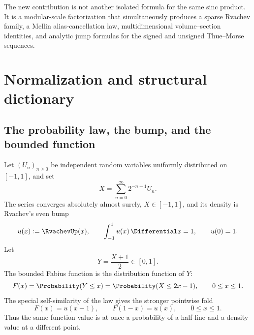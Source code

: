 \documentclass[11pt]{article}
\theoremstyle{definition}
\theoremstyle{remark}
\begin{document}
\begin{statusboxPartx}
The new contribution is not another isolated formula for the same sinc product.
It is a modular-scale factorization that simultaneously produces a sparse
Rvachev family, a Mellin alias-cancellation law, multidimensional volume--section
identities, and analytic jump formulas for the signed and unsigned Thue--Morse
sequences.
\end{statusboxPartx}

\section{Normalization and structural dictionary}
\label{p5:sec:normalization}

\subsection{The probability law, the bump, and the bounded function}

Let $(U_n)_{n\ge0}$ be independent random variables uniformly distributed on
$[-1,1]$, and set
\begin{equation}
 X=\sum_{n=0}^{\infty}2^{-n-1}U_n.                         \label{p5:eq:X-series}
\end{equation}
The series converges absolutely almost surely, $X\in[-1,1]$, and its density is
Rvachev's even bump
\begin{equation}
 u(x):=\RvachevUp(x),\qquad \int_{-1}^{1}u(x)\,\Differential x=1,
 \qquad u(0)=1.                                            \label{p5:eq:u-normalization}
\end{equation}
Let
\begin{equation}
 Y=\frac{X+1}{2}\in[0,1].                                  \label{p5:eq:Y-def}
\end{equation}
The bounded Fabius function is the distribution function of $Y$:
\begin{equation}
 F(x)=\Probability(Y\le x)=\Probability(X\le2x-1),\qquad 0\le x\le1.   \label{p5:eq:F-cdf}
\end{equation}
The special self-similarity of the law gives the stronger pointwise fold
\begin{equation}
 F(x)=u(x-1),\qquad F(1-x)=u(x),\qquad 0\le x\le1.          \label{p5:eq:F-u-fold}
\end{equation}
Thus the same function value is at once a probability of a half-line and a
density value at a different point.
\end{document}
